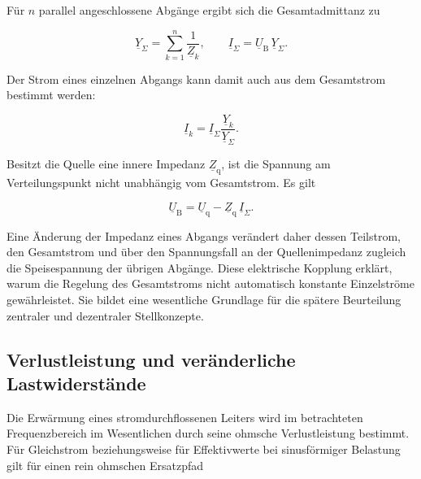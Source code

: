 Für \(n\) parallel angeschlossene Abgänge ergibt sich die Gesamtadmittanz zu

\begin{equation}
  \underline{Y}_{\Sigma}
  =
  \sum_{k=1}^{n}\frac{1}{\underline{Z}_k},
  \qquad
  \underline{I}_{\Sigma}
  =
  \underline{U}_{\mathrm{B}}\,\underline{Y}_{\Sigma}.
  \label{eq:gesamtadmittanz}
\end{equation}

Der Strom eines einzelnen Abgangs kann damit auch aus dem Gesamtstrom
bestimmt werden:

\begin{equation}
  \underline{I}_k
  =
  \underline{I}_{\Sigma}
  \frac{\underline{Y}_k}{\underline{Y}_{\Sigma}}.
  \label{eq:stromaufteilung_parallel}
\end{equation}

Besitzt die Quelle eine innere Impedanz \(\underline{Z}_{\mathrm{q}}\), ist die
Spannung am Verteilungspunkt nicht unabhängig vom Gesamtstrom. Es gilt

\begin{equation}
  \underline{U}_{\mathrm{B}}
  =
  \underline{U}_{\mathrm{q}}
  -
  \underline{Z}_{\mathrm{q}}\,\underline{I}_{\Sigma}.
  \label{eq:quellimpedanz_sammelschiene}
\end{equation}

Eine Änderung der Impedanz eines Abgangs verändert daher dessen Teilstrom,
den Gesamtstrom und über den Spannungsfall an der Quellenimpedanz zugleich die
Speisespannung der übrigen Abgänge. Diese elektrische Kopplung erklärt, warum
die Regelung des Gesamtstroms nicht automatisch konstante Einzelströme
gewährleistet. Sie bildet eine wesentliche Grundlage für die spätere
Beurteilung zentraler und dezentraler Stellkonzepte.


\subsection{Verlustleistung und veränderliche Lastwiderstände}
\label{sec:verlustleistung_temperaturkoeffizient}

Die Erwärmung eines stromdurchflossenen Leiters wird im betrachteten
Frequenzbereich im Wesentlichen durch seine ohmsche Verlustleistung bestimmt.
Für Gleichstrom beziehungsweise für Effektivwerte bei sinusförmiger Belastung
gilt für einen rein ohmschen Ersatzpfad

